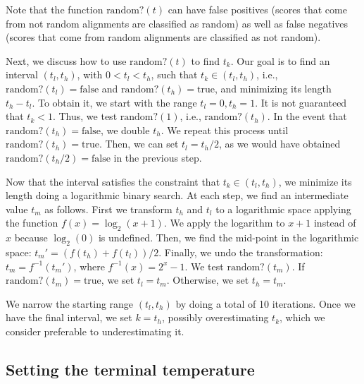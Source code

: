 \documentclass[]{article}
\begin{document}
Note that the function $\mbox{random?}(t)$ can have false positives (scores that come from not random alignments are classified as random) as well as false negatives (scores that come from random alignments are classified as not random). %

Next, we discuss how to use $\mbox{random?}(t)$ to find $t_k$. Our goal is to find an interval $(t_l,t_h)$, with $0<t_l<t_h$, such that $t_k\in(t_l,t_h)$, i.e., $\mbox{random?}(t_l)=\mbox{false}$ and $\mbox{random?}(t_h)=\mbox{true}$, and minimizing its length $t_h-t_l$. To obtain it, we start with the range $t_l=0,t_h=1$. It is not guaranteed that $t_k<1$. Thus, we test $\mbox{random?}(1)$, i.e., $\mbox{random?}(t_h)$. In the event that $\mbox{random?}(t_h)=\mbox{false}$, we double $t_h$. We repeat this process until $\mbox{random?}(t_h)=\mbox{true}$. Then, we can set $t_l=t_h/2$, as we would have obtained $\mbox{random?}(t_h/2)=\mbox{false}$ in the previous step.

Now that the interval satisfies the constraint that $t_k\in(t_l,t_h)$, we minimize its length doing a logarithmic binary search. At each step, we find an intermediate value $t_m$ as follows. First we transform $t_h$ and $t_l$ to a logarithmic space applying the function $f(x)=\log_2(x+1)$. We apply the logarithm to $x+1$ instead of $x$ because $\log_2(0)$ is undefined. Then, we find the mid-point in the logarithmic space: $t_m'=(f(t_h)+f(t_l))/2$. Finally, we undo the transformation: $t_m=f^{-1}(t_m')$, where $f^{-1}(x)=2^{x}-1$. We test $\mbox{random?}(t_m)$. If $\mbox{random?}(t_m)=\mbox{true}$, we set $t_l=t_m$. Otherwise, we set $t_h=t_m$.

We narrow the starting range $(t_l,t_h)$ by doing a total of 10 iterations. Once we have the final interval, we set $k=t_h$, possibly overestimating $t_k$, which we consider preferable to underestimating it.



\subsection{Setting the terminal temperature}
\end{document}
